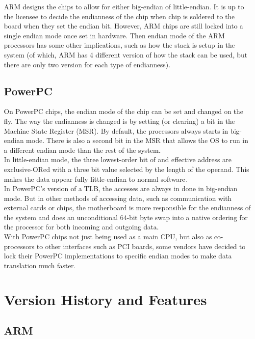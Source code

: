 \documentclass[letterpaper,10pt,titlepage]{article}
\begin{document}
ARM designs the chips to allow for either big-endian of little-endian. It is up to the licensee to decide the endianness of the chip when chip is soldered to the board when they set the endian bit. However, ARM chips are still locked into a single endian mode once set in hardware. Then endian mode of the ARM processors has some other implications, such as how the stack is setup in the system (of which, ARM has 4 different version of how the stack can be used, but there are only two version for each type of endianness).

\subsection{PowerPC}

On PowerPC chips, the endian mode of the chip can be set and changed on the fly. The way the endianness is changed is by setting (or clearing) a bit in the Machine State Register (MSR). By default, the processors always starts in big-endian mode. There is also a second bit in the MSR that allows the OS to run in a different endian mode than the rest of the system.\\

In little-endian mode, the three lowest-order bit of and effective address are exclusive-ORed with a three bit value selected by the length of the operand. This makes the data appear fully little-endian to normal software.\\

In PowerPC's version of a TLB, the accesses are always in done in big-endian mode. But in other methods of accessing data, such as communication with external cards or chips, the motherboard is more responsible for the endianness of the system and does an unconditional 64-bit byte swap into a native ordering  for the processor for both incoming and outgoing data\cite{May}.\\

With PowerPC chips not just being used as a main CPU, but also as co-processors to other interfaces such as PCI boards, some vendors have decided to lock their PowerPC implementations to specific endian modes to make data translation much faster.

\section{Version History and Features}
\subsection{ARM}\cite{ARMltd}
\end{document}
